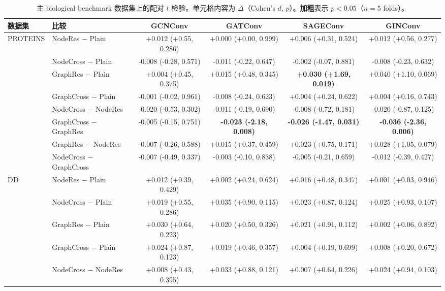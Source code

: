 \begin{table}[t]
\centering
\scriptsize
\setlength{\tabcolsep}{3pt}
\caption{主 biological benchmark 数据集上的配对 $t$ 检验。单元格内容为 $\Delta$（Cohen's $d$, $p$）。\textbf{加粗}表示 $p<0.05$（$n{=}5$ folds）。}
\label{tab:statistical_tests_main}
\begin{tabular}{llcccc}
\toprule
数据集 & 比较 & GCNConv & GATConv & SAGEConv & GINConv \\
\midrule
PROTEINS & NodeRes $-$ Plain & +0.012 (+0.55, 0.286) & +0.000 (+0.00, 0.999) & +0.006 (+0.31, 0.524) & +0.012 (+0.56, 0.277) \\
 & NodeCross $-$ Plain & -0.008 (-0.28, 0.571) & -0.011 (-0.22, 0.647) & -0.002 (-0.07, 0.881) & -0.008 (-0.23, 0.632) \\
 & GraphRes $-$ Plain & +0.004 (+0.45, 0.375) & +0.015 (+0.48, 0.345) & \textbf{+0.030 (+1.69, 0.019)} & +0.040 (+1.10, 0.069) \\
 & GraphCross $-$ Plain & -0.001 (-0.02, 0.961) & -0.008 (-0.24, 0.623) & +0.004 (+0.24, 0.622) & +0.004 (+0.16, 0.743) \\
 & NodeCross $-$ NodeRes & -0.020 (-0.53, 0.302) & -0.011 (-0.19, 0.690) & -0.008 (-0.72, 0.181) & -0.020 (-0.87, 0.125) \\
 & GraphCross $-$ GraphRes & -0.005 (-0.15, 0.751) & \textbf{-0.023 (-2.18, 0.008)} & \textbf{-0.026 (-1.47, 0.031)} & \textbf{-0.036 (-2.36, 0.006)} \\
 & GraphRes $-$ NodeRes & -0.007 (-0.26, 0.588) & +0.015 (+0.37, 0.459) & +0.023 (+0.75, 0.171) & +0.028 (+1.05, 0.079) \\
 & NodeCross $-$ GraphCross & -0.007 (-0.49, 0.337) & -0.003 (-0.10, 0.838) & -0.005 (-0.21, 0.659) & -0.012 (-0.39, 0.427) \\
\midrule
DD & NodeRes $-$ Plain & +0.012 (+0.39, 0.429) & +0.002 (+0.24, 0.624) & +0.016 (+0.48, 0.347) & +0.001 (+0.03, 0.946) \\
 & NodeCross $-$ Plain & +0.019 (+0.55, 0.286) & +0.035 (+0.90, 0.115) & +0.023 (+0.87, 0.124) & +0.025 (+0.93, 0.107) \\
 & GraphRes $-$ Plain & +0.030 (+0.64, 0.223) & +0.020 (+0.50, 0.326) & +0.021 (+0.91, 0.112) & +0.002 (+0.06, 0.892) \\
 & GraphCross $-$ Plain & +0.024 (+0.87, 0.123) & +0.019 (+0.46, 0.357) & +0.004 (+0.19, 0.699) & +0.008 (+0.20, 0.672) \\
 & NodeCross $-$ NodeRes & +0.008 (+0.43, 0.395) & +0.033 (+0.88, 0.121) & +0.007 (+0.64, 0.226) & +0.024 (+0.94, 0.103) \\

\end{tabular}
\end{table}
